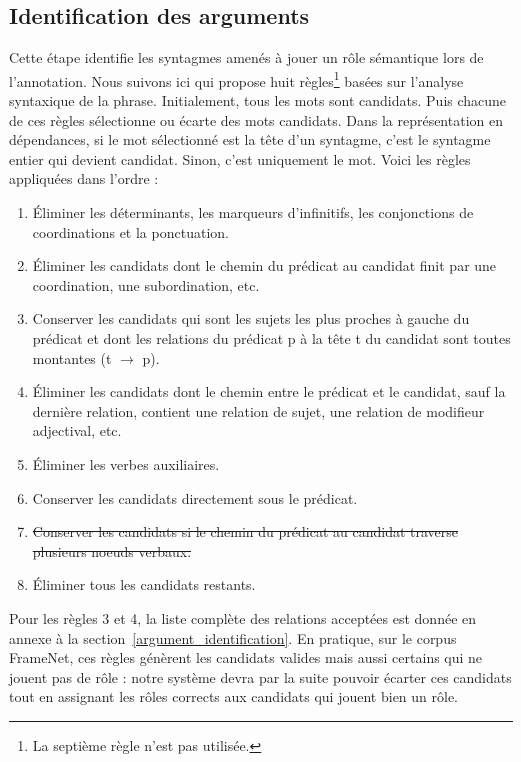 \subsection{Identification des arguments}

Cette étape identifie les syntagmes amenés à jouer un rôle sémantique lors de
l'annotation. Nous suivons ici \cite{lang2011unsupervised} qui propose huit
règles\footnote{La septième règle n'est pas utilisée.} basées sur l'analyse
syntaxique de la phrase. Initialement, tous les mots sont candidats. Puis
chacune de ces règles sélectionne ou écarte des mots candidats. Dans la
représentation en dépendances, si le mot sélectionné est la tête d'un syntagme,
c'est le syntagme entier qui devient candidat. Sinon, c'est uniquement le mot.
Voici les règles appliquées dans l'ordre :

\begin{enumerate}
    \item Éliminer les déterminants, les marqueurs d'infinitifs, les conjonctions de coordinations et la ponctuation.
    \item Éliminer les candidats dont le chemin du prédicat au candidat finit par une coordination, une subordination, etc.
    \item Conserver les candidats qui sont les sujets les plus proches à gauche du prédicat et dont les relations du prédicat p à la tête t du candidat sont toutes montantes (t $\rightarrow$ p).
    \item Éliminer les candidats  dont le chemin entre le prédicat et le candidat, sauf la dernière relation, contient une relation de sujet, une relation de modifieur adjectival, etc.
    \item Éliminer les verbes auxiliaires.
    \item Conserver les candidats directement sous le prédicat.
    \item \sout{Conserver les candidats si le chemin du prédicat au candidat traverse plusieurs noeuds verbaux.}
    \item Éliminer tous les candidats restants.
\end{enumerate}

Pour les règles 3 et 4, la liste complète des relations acceptées est donnée en
annexe à la section~\ref{argument_identification}. En pratique, sur le corpus
FrameNet, ces règles génèrent les candidats valides mais aussi certains qui ne
jouent pas de rôle : notre système devra par la suite pouvoir écarter ces
candidats tout en assignant les rôles corrects aux candidats qui jouent bien un
rôle.

